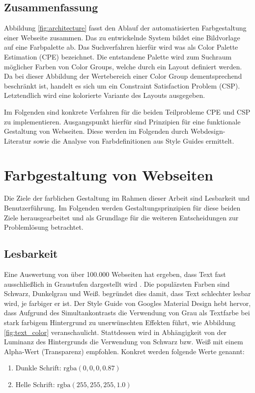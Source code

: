 \documentclass[11pt,a4paper,bibliography=totoc,twocolumn]{scrartcl}
\begin{document}
\subsection*{Zusammenfassung}

Abbildung \ref{fig:architecture} fasst den Ablauf der automatisierten Farbgestaltung einer Webseite zusammen. Das zu entwickelnde System bildet eine Bildvorlage auf eine Farbpalette ab. Das Suchverfahren hierfür wird was als Color Palette Estimation (CPE) bezeichnet. Die entstandene Palette wird zum Suchraum möglicher Farben von Color Groups, welche durch ein Layout definiert werden. Da bei dieser Abbildung der Wertebereich einer Color Group dementsprechend beschränkt ist, handelt es sich um ein Constraint Satisfaction Problem (CSP). Letztendlich wird eine kolorierte Variante des Layouts ausgegeben.

Im Folgenden sind konkrete Verfahren für die beiden Teilprobleme CPE und CSP zu implementieren. Ausgangspunkt hierfür sind Prinzipien für eine funktionale Gestaltung von Webseiten. Diese werden im Folgenden durch Webdesign-Literatur sowie die Analyse von Farbdefinitionen aus Style Guides ermittelt.

\section{Farbgestaltung von Webseiten}
Die Ziele der farblichen Gestaltung im Rahmen dieser Arbeit sind Lesbarkeit und Benutzerführung. Im Folgenden werden Gestaltungsprinzipien für diese beiden Ziele herausgearbeitet und als Grundlage für die weiteren Entscheidungen zur Problemlösung betrachtet.

\subsection{Lesbarkeit}

Eine Auswertung von über 100.000 Webseiten hat ergeben, dass Text fast ausschließlich in Graustufen dargestellt wird \citep{webzeitgeist}. Die populärsten Farben sind Schwarz, Dunkelgrau und Weiß. \citet{webdesign} begründet dies damit, dass Text schlechter lesbar wird, je farbiger er ist. Der Style Guide von Googles Material Design \citep{google} hebt hervor, dass Aufgrund des Simultankontrasts die Verwendung von Grau als Textfarbe bei stark farbigem Hintergrund zu unerwünschten Effekten führt, wie Abbildung \ref{fig:text_color} veranschaulicht. Stattdessen wird in Abhängigkeit von der Luminanz des Hintergrunds die Verwendung von Schwarz bzw. Weiß mit einem Alpha-Wert (Transparenz) empfohlen. Konkret werden folgende Werte genannt:
\begin{enumerate}
	\item Dunkle Schrift: $\text{rgba}(0, 0, 0, 0.87)$
	\item Helle Schrift: $\text{rgba}(255, 255, 255, 1.0)$
\end{enumerate}
\end{document}
